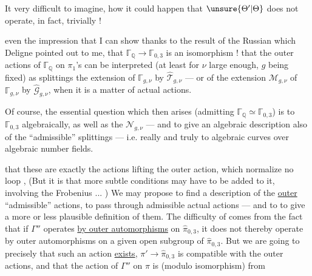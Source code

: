It  very difficult to imagine, how it \unsure{\deleted{$\Theta$}} could happen that $\unsure{\Theta'|\Theta}$ does not operate, in fact, trivially ! 

even the impression that I can show thanks to the result of the Russian which Deligne pointed out to me,  that $\mathbb{\Gamma}_{\mathbb Q}\longrightarrow\mathbb{\Gamma}_{0,3}$ is an isomorphism !   that the outer actions of $\mathbb{\Gamma}_{\mathbb Q}$ on $\pi_1$'s  can be interpreted (at least for $\nu$ large enough, $g$ being fixed) as splittings  the extension  of $\mathbb{\Gamma}_{g,\nu}$ by $\widehat{\mathcal T}_{g,\nu}$ — or of the extension $\mathcal M_{g,\nu}$ of $\mathbb{\Gamma}_{g,\nu}$ by $\widehat{\mathcal G}_{g,\nu}$, when it is a matter of actual actions.

Of course, the essential question which then arises (admitting $\mathbb{\Gamma}_{\mathbb Q}\simeq\mathbb{\Gamma}_{0,3}$) is to  $\mathbb{\Gamma}_{0,3}$ algebraically, as well as the $\mathcal N_{g,\nu}$ — and to give an algebraic description also of the ``admissible'' splittings — i.e.  really and truly to algebraic curves over algebraic number fields.


that  these are exactly the actions lifting the  outer action, which normalize no loop ,  (But it is  that more subtle conditions may have to be added to it, involving the Frobenius ... ) We may propose to find a description of the \uline{outer} ``admissible'' actions,   to pass through admissible actual actions — and to \linebreak{} to give a more or less plausible definition of them. The difficulty of  comes from the fact that if $\Gamma''$ operates \uline{by outer automorphisms} on  $\widehat{\pi}_{0,3}$, it does not thereby operate by outer automorphisms on a given open subgroup  of $\widehat{\pi}_{0,3}$. But we are going to  precisely that such an action \uline{exists},    $\pi'\longrightarrow\widehat{\pi}_{0,3}$ is compatible with the outer actions, and that the action of $\Gamma''$ on $\pi$ is  (modulo isomorphism) from